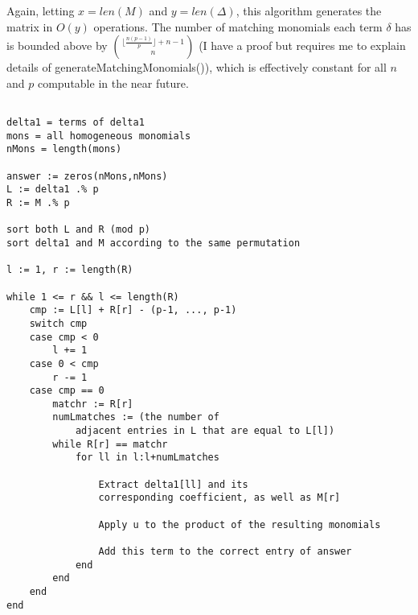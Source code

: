 Again, letting $x = len(M)$ and $y = len(\Delta)$, this algorithm generates the matrix in $O(y)$ operations. The number of matching monomials each term $\delta$ has is bounded above by $\binom{\lfloor \frac{n(p - 1)}{p} \rfloor + n - 1}{n}$ (I have a proof but requires me to explain details of generateMatchingMonomials()), which is effectively constant for all $n$ and $p$ computable in the near future.


\begin{alg}

\begin{lstlisting}

delta1 = terms of delta1
mons = all homogeneous monomials
nMons = length(mons)

answer := zeros(nMons,nMons)
L := delta1 .% p
R := M .% p

sort both L and R (mod p)
sort delta1 and M according to the same permutation

l := 1, r := length(R)

while 1 <= r && l <= length(R)
    cmp := L[l] + R[r] - (p-1, ..., p-1)
    switch cmp
    case cmp < 0
        l += 1
    case 0 < cmp
        r -= 1
    case cmp == 0
        matchr := R[r]
        numLmatches := (the number of 
            adjacent entries in L that are equal to L[l])
        while R[r] == matchr
            for ll in l:l+numLmatches

                Extract delta1[ll] and its 
                corresponding coefficient, as well as M[r]

                Apply u to the product of the resulting monomials

                Add this term to the correct entry of answer
            end
        end
    end	
end		

\end{lstlisting}


%	
%	
%
%
%
%
%
%
%
%
%
%
%
%
%
%
%
%
%
%
%
%
%
%	
%
%
\end{alg}

